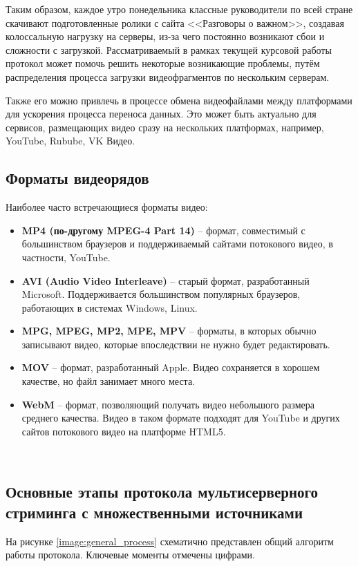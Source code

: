 Таким образом, каждое утро понедельника классные руководители по всей стране скачивают подготовленные ролики с сайта <<Разговоры о важном>>, создавая колоссальную нагрузку на серверы, из-за чего постоянно возникают сбои и сложности с загрузкой. Рассматриваемый в рамках текущей курсовой работы протокол может помочь решить некоторые возникающие проблемы, путём распределения процесса загрузки видеофрагментов по нескольким серверам.

Также его можно привлечь в процессе обмена видеофайлами между платформами для ускорения процесса переноса данных. Это может быть актуально для сервисов, размещающих видео сразу на нескольких платформах, например, YouTube, Rubube, VK Видео. \\

\subsection{Форматы видеорядов}
Наиболее часто встречающиеся форматы видео:
\begin{itemize}
	\item \textbf{MP4 (по-другому MPEG-4 Part 14)} – формат, совместимый с большинством браузеров и поддерживаемый сайтами потокового видео, в частности, YouTube.
	
	\item \textbf{AVI (Audio Video Interleave)} – старый формат, разработанный Microsoft. Поддерживается большинством популярных браузеров, работающих в системах Windows, Linux. 
	
	\item \textbf{MPG, MPEG, MP2, MPE, MPV} – форматы, в которых обычно записывают видео, которые впоследствии не нужно будет редактировать.
	
	\item \textbf{MOV} – формат, разработанный Apple. Видео сохраняется в хорошем качестве, но файл занимает много места.
	
	\item \textbf{WebM} – формат, позволяющий получать видео небольшого размера среднего качества. Видео в таком формате подходят для YouTube и других сайтов потокового видео на платформе HTML5.
\end{itemize}

\\

\subsection{Основные этапы протокола мультисерверного стриминга с множественными источниками}
На рисунке \ref{image:general_process} схематично представлен общий алгоритм работы протокола. Ключевые моменты отмечены цифрами.

